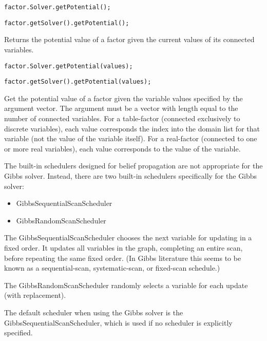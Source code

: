 
\ifmatlab
\begin{lstlisting}
factor.Solver.getPotential();
\end{lstlisting}
\fi

\ifjava
\begin{lstlisting}
factor.getSolver().getPotential();
\end{lstlisting}
\fi

Returns the potential value of a factor given the current values of its connected variables.

\ifmatlab
\begin{lstlisting}
factor.Solver.getPotential(values);
\end{lstlisting}
\fi

\ifjava
\begin{lstlisting}
factor.getSolver().getPotential(values);
\end{lstlisting}
\fi

Get the potential value of a factor given the variable values specified by the argument vector. The argument must be a vector with length equal to the number of connected variables. For a table-factor (connected exclusively to discrete variables), each value corresponds the index into the domain list for that variable (not the value of the variable itself). For a real-factor (connected to one or more real variables), each value corresponds to the value of the variable.


The built-in schedulers designed for belief propagation are not appropriate for the Gibbs solver.  Instead, there are two built-in schedulers specifically for the Gibbs solver:

\begin{itemize}
\item GibbsSequentialScanScheduler
\item GibbsRandomScanScheduler
\end{itemize}

The GibbsSequentialScanScheduler chooses the next variable for updating in a fixed order. It updates all variables in the graph, completing an entire scan, before repeating the same fixed order. (In Gibbs literature this seems to be known as a sequential-scan, systematic-scan, or fixed-scan schedule.)

The GibbsRandomScanScheduler randomly selects a variable for each update (with replacement).

The default scheduler when using the Gibbs solver is the GibbsSequentialScanScheduler, which is used if no scheduler is explicitly specified.

